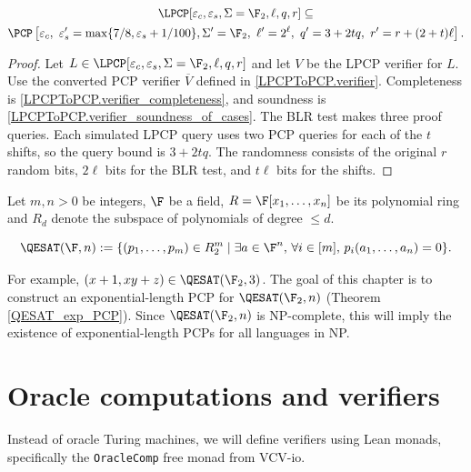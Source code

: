 \begin{lemma}
\label{LPCP_to_PCP_ZMod2}
\leanok
\begin{gather*}
\LPCP[\varepsilon_c,\varepsilon_s,\Sigma=\F_{2},\ell,q,r] \subseteq\\
\PCP\left[
\varepsilon_c,\
\varepsilon_s'=\max\{7/8,\varepsilon_s+1/100\},
\Sigma'=\F_{2},\
\ell'=2^{\ell},\
q'=3+2tq,\
r'=r+(2+t)\ell
\right].
\end{gather*}
\end{lemma}
\begin{proof}\leanok
Let $L \in \LPCP[\varepsilon_c,\varepsilon_s,\Sigma=\F_{2},\ell,q,r]$ and let $V$ be the LPCP verifier for $L$. Use the converted PCP verifier $\overline V$ defined in \ref{LPCPToPCP.verifier}.
Completeness is
\ref{LPCPToPCP.verifier_completeness}, and soundness is
\ref{LPCPToPCP.verifier_soundness_of_cases}. The BLR test makes three proof
queries. Each simulated LPCP query uses two PCP queries for each of the \(t\)
shifts, so the query bound is \(3+2tq\). The randomness consists of the
original \(r\) random bits, \(2\ell\) bits for the BLR test, and \(t\ell\) bits
for the shifts.
\end{proof}


\nocite{Chiesa2024-fopp-course}
\begin{definition}
\label{QESAT}
\lean{QESAT}
\leanok
Let \(m,n >0\) be integers, \(\F\) be a field, \(R = \F[x_{1},\dots,x_{n}]\) be its polynomial ring and \(R_{d}\) denote the subspace of polynomials of degree \(\leq d\).

\[
  \QESAT(\F,n) :=
  \{ (p_1, \ldots, p_m) \in R^m_{2} \mid
    \exists a \in \F^n, \,
    \forall i \in [m], \,
    p_i(a_1, \ldots, a_n) = 0 \}.
\]
\end{definition}

For example, $(x + 1, xy + z) \in \QESAT(\F_2,3)$.
The goal of this chapter is to construct an exponential-length PCP for
\(\QESAT(\F_2,n)\) (Theorem \ref{QESAT_exp_PCP}). Since \(\QESAT(\F_2,n)\) is NP-complete, this will imply the existence of exponential-length PCPs for all languages in NP.

\section{Oracle computations and verifiers}
Instead of oracle Turing machines, we will define verifiers using Lean monads, specifically the \texttt{OracleComp} free monad from VCV-io.

